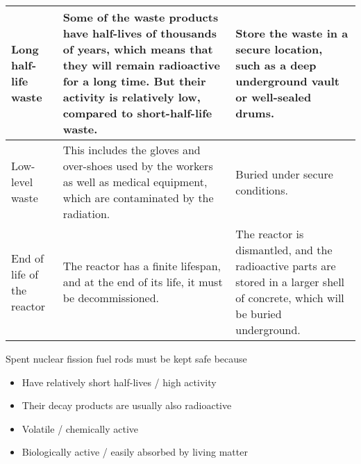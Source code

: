 \documentclass[a4paper,12pt]{article}
\begin{document}
\begin{longtable}{|p{}|p{}|p{}|}
  Long half-life waste                                                                                         & Some of the waste products have half-lives of thousands of years, which means that they will remain radioactive for a long time. But their activity is relatively low, compared to short-half-life waste.                & Store the waste in a secure location, such as a deep underground vault or well-sealed drums.                                                            \\ \hline
  Low-level waste                                                                                              & This includes the gloves and over-shoes used by the workers as well as medical equipment, which are contaminated by the radiation.                                                                                       & Buried under secure conditions.                                                                                                                         \\ \hline
  End of life of the reactor                                                                                   & The reactor has a finite lifespan, and at the end of its life, it must be decommissioned.                                                                                                                                & The reactor is dismantled, and the radioactive parts are stored in a larger shell of concrete, which will be buried underground.                        \\ \hline
\end{longtable}

Spent nuclear fission fuel rods must be kept safe because
\begin{itemize}
  \item Have relatively short half-lives / high activity
  \item Their decay products are usually also radioactive
  \item Volatile / chemically active
  \item Biologically active / easily absorbed by living matter
\end{itemize}
\end{document}
